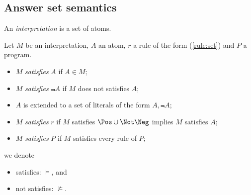 \subsection{Answer set semantics}
\begin{frame}
An {\em interpretation} is a set of atoms.

Let $M$ be an interpretation, $A$ an atom, $r$ a rule of the form (\ref{rule:set}) and $P$ a program.
\begin{itemize}
  \item $M$ {\em satisfies} $A$ if $A\in M$;
  \item $M$ {\em satisfies} $\Not A$ if $M$ does not satisfies $A$;
  \item $A$ is extended to a set of literals of the form $A,\Not A$;
  \item $M$ {\em satisfies} $r$ if $M$ satisfies $\Pos\cup\Not\Neg$ implies $M$ satisfies $A$;
  \item $M$ {\em satisfies} $P$ if $M$ satisfies every rule of $P$;
\end{itemize}
we denote
\begin{itemize}
  \item satisfies: $\models$, and
  \item not satisfies: $\not\models$.
\end{itemize}

\end{frame}
%
%
